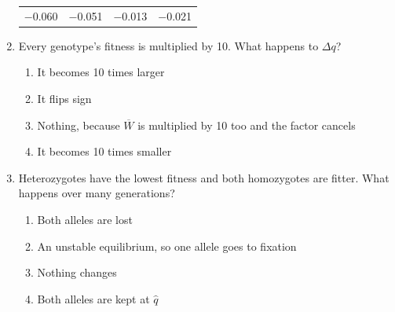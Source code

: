 \documentclass[11pt]{article}
\newcommand{\work}[1]{\par\vspace{#1}}
\begin{document}
\begin{enumerate}[label=\textbf{\arabic*.}, leftmargin=2em, itemsep=1.4em]
\begin{tabularx}{\linewidth}{@{}YYYY@{}}
\(-\)0.060 & \(-\)0.051 & \(-\)0.013 & \(-\)0.021 \\
\end{tabularx}
\work{1.6cm}
\item Every genotype's fitness is multiplied by 10. What happens to \(\Delta q\)?
\par\smallskip
\begin{enumerate}[label={}, leftmargin=2.4em, labelwidth=0pt, itemsep=2pt, topsep=0pt]
\item \hspace*{-2.4em}It becomes 10 times larger
\item \hspace*{-2.4em}It flips sign
\item \hspace*{-2.4em}Nothing, because \(\overline{W}\) is multiplied by 10 too and the factor cancels
\item \hspace*{-2.4em}It becomes 10 times smaller
\end{enumerate}
\item Heterozygotes have the lowest fitness and both homozygotes are fitter. What happens over many generations?
\par\smallskip
\begin{enumerate}[label={}, leftmargin=2.4em, labelwidth=0pt, itemsep=2pt, topsep=0pt]
\item \hspace*{-2.4em}Both alleles are lost
\item \hspace*{-2.4em}An unstable equilibrium, so one allele goes to fixation
\item \hspace*{-2.4em}Nothing changes
\item \hspace*{-2.4em}Both alleles are kept at \(\hat{q}\)
\end{enumerate}
\end{enumerate}
\end{document}
